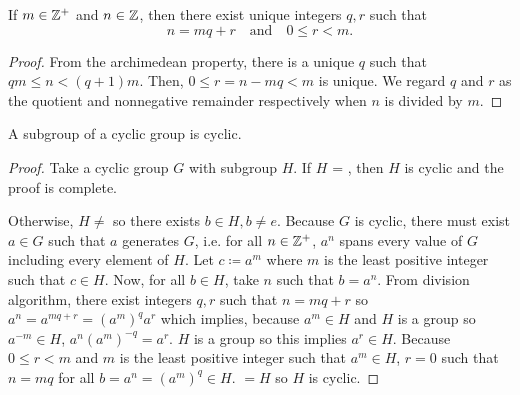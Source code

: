 \begin{theorem}
    If $m\in\mathbb{Z}^+$ and $n\in\mathbb{Z}$, then there exist unique integers $q,r$ such that $$n=mq+r \quad\text{and}\quad 0\leq r<m.$$
\end{theorem}
\begin{proof}
    From the archimedean property, there is a unique $q$ such that $qm\leq n < (q+1)m$. Then, $0 \leq r = n - mq < m$ is unique. We regard $q$ and $r$ as the quotient and nonnegative remainder respectively when $n$ is divided by $m$.
\end{proof}
\begin{theorem}
    A subgroup of a cyclic group is cyclic.
\end{theorem}
\begin{proof}
    Take a cyclic group $G$ with subgroup $H$. If $H$ = , then $H$ is cyclic and the proof is complete.

    Otherwise, $H \neq$  so there exists $b \in H, b \neq e$. Because $G$ is cyclic, there must exist $a \in G$ such that $a$ generates $G$, i.e. for all $n \in \mathbb{Z}^+$, $a^n$ spans every value of $G$ including every element of $H$. Let $c \coloneq a^m$ where $m$ is the least positive integer such that $c \in H$. Now, for all $b \in H$, take $n$ such that $b = a^n$. From division algorithm, there exist integers $q,r$ such that $n = mq+r$ so $a^n = a^{mq+r} = (a^m)^qa^r$ which implies, because $a^{m} \in H$ and $H$ is a group so $a^{-m} \in H$, $a^n(a^m)^{-q}=a^r$. $H$ is a group so this implies $a^r \in H$. Because $0 \leq r < m$ and $m$ is the least positive integer such that $a^m \in H$, $r=0$ such that $n = mq$ for all $b=a^n = (a^m)^q \in H$.  $= H$ so $H$ is cyclic.
\end{proof}